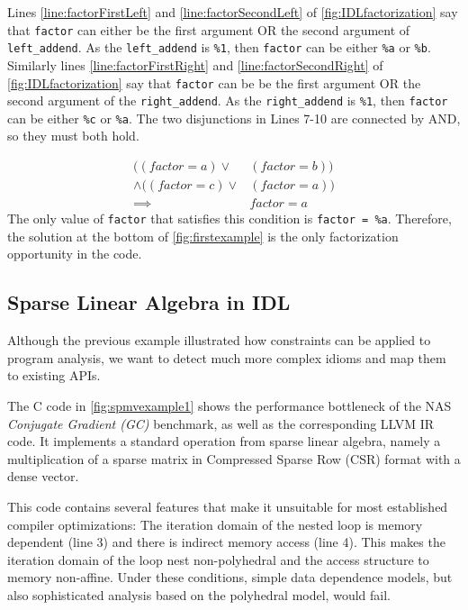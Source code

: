     Lines \ref{line:factorFirstLeft} and \ref{line:factorSecondLeft} of
    \autoref{fig:IDLfactorization} say that {\tt factor} can either be the first
    argument OR the second argument of {\tt left\_addend}.
    As the {\tt left\_addend} is {\tt \%1}, then {\tt factor} can be either
    {\tt \%a} or {\tt \%b}.
    Similarly lines \ref{line:factorFirstRight} and
    \ref{line:factorSecondRight} of \autoref{fig:IDLfactorization} say that
    {\tt factor} can be be the first argument OR the second argument of the
    {\tt right\_addend}.
    As the {\tt right\_addend} is {\tt \%1}, then {\tt factor} can be either
    {\tt \%c} or {\tt \%a}.
    The two disjunctions in Lines 7-10 are connected by AND, so they must both
    hold.

\begin{equation}
\begin{split}
((factor = a) \lor & (factor = b)) \\\land ((factor = c) \lor & (factor = a)) \\
\implies & factor = a 
\end{split}
\nonumber
\end{equation}
The only value of {\tt factor} that satisfies this condition is {\tt factor = \%a}.
Therefore, the solution at the bottom of \autoref{fig:firstexample} is the only factorization opportunity in the code.

\begin{figure}[p]
    
\end{figure}

\subsection{Sparse Linear Algebra in IDL}

    Although the previous example illustrated how constraints can be applied to 
    program analysis, we want to detect much more complex idioms and 
    map them to existing APIs.

    The C code in \autoref{fig:spmvexample1} shows the performance bottleneck of
    the NAS \emph{Conjugate Gradient (GC)} benchmark, as well as the
    corresponding LLVM IR code.
    It implements a standard operation from sparse linear algebra, namely a
    multiplication of a sparse matrix in Compressed Sparse Row (CSR) format with
    a dense vector.

    This code contains several features that make it unsuitable for most
    established compiler optimizations:
    The iteration domain of the nested loop is memory dependent (line 3) and
    there is indirect memory access (line 4).
    This makes the iteration domain of the loop nest non-polyhedral and the
    access structure to memory non-affine.
    Under these conditions, simple data dependence models, but also
    sophisticated analysis based on the polyhedral model, would fail.

